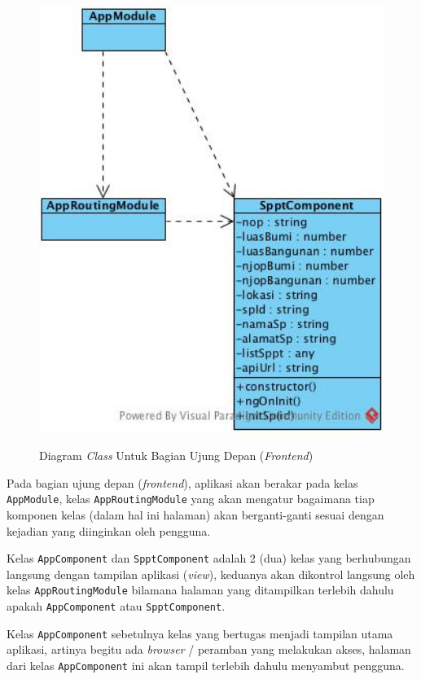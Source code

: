\begin{figure}[H]
	\centering
	\includegraphics[width=1\textwidth]{./resources/uml/class-diagram-fe}
	\label{fig:class-dia-fe}
	\caption{Diagram \textit{Class} Untuk Bagian Ujung Depan (\textit{Frontend})}
\end{figure}

Pada bagian ujung depan (\textit{frontend}), aplikasi akan berakar pada kelas \texttt{AppModule}, kelas \texttt{AppRoutingModule} yang akan mengatur bagaimana tiap komponen kelas (dalam hal ini halaman) akan berganti-ganti sesuai dengan kejadian yang diinginkan oleh pengguna.

Kelas \texttt{AppComponent} dan \texttt{SpptComponent} adalah 2 (dua) kelas yang berhubungan langsung dengan tampilan aplikasi (\textit{view}), keduanya akan dikontrol langsung oleh kelas \texttt{AppRoutingModule} bilamana halaman yang ditampilkan terlebih dahulu apakah \texttt{AppComponent} atau \texttt{SpptComponent}.

Kelas \texttt{AppComponent} sebetulnya kelas yang bertugas menjadi tampilan utama aplikasi, artinya begitu ada \textit{browser} / peramban yang melakukan akses, halaman dari kelas \texttt{AppComponent} ini akan tampil terlebih dahulu menyambut pengguna.

